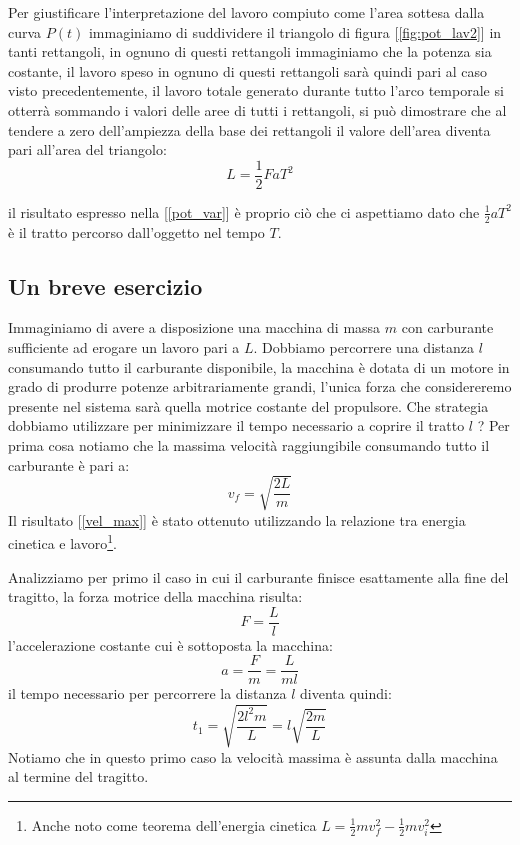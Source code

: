 \documentclass[a4paper,10pt,oneside]{article}
\begin{document}
Per giustificare l'interpretazione del lavoro compiuto come l'area sottesa dalla curva $P(t)$ immaginiamo di suddividere il triangolo di figura [\ref{fig:pot_lav2}] in tanti rettangoli, in ognuno di questi rettangoli immaginiamo che la potenza sia costante, il lavoro speso in ognuno di questi rettangoli sarà quindi pari al caso visto precedentemente, il lavoro totale generato durante tutto l'arco temporale si otterrà sommando i valori delle aree di tutti i rettangoli, si può dimostrare che al tendere a zero dell'ampiezza della base dei rettangoli il valore dell'area diventa pari all'area del triangolo:
\begin{equation}\label{pot_var}
 L=\frac 1 2 FaT^2
\end{equation}

il risultato espresso nella [\ref{pot_var}] è proprio ciò che ci aspettiamo dato che $\frac 1 2 aT^2$ è il tratto percorso dall'oggetto nel tempo $T$.

\subsection*{Un breve esercizio}

Immaginiamo di avere a disposizione una macchina di massa $m$ con carburante sufficiente ad erogare un lavoro pari a $L$. Dobbiamo percorrere una distanza $l$ consumando tutto il carburante disponibile, la macchina è dotata di un motore in grado di produrre potenze arbitrariamente grandi, l'unica forza che considereremo presente nel sistema sarà quella motrice costante del propulsore. Che strategia dobbiamo utilizzare per minimizzare il tempo necessario a coprire il tratto $l$
?
Per prima cosa notiamo che la massima velocità raggiungibile consumando tutto il carburante è pari a:
\begin{equation}\label{vel_max}
 v_f=\sqrt{\frac{2L}{m}}
\end{equation}
Il risultato [\ref{vel_max}] è stato ottenuto utilizzando la relazione tra energia cinetica e lavoro\footnote{Anche noto come teorema dell'energia cinetica $L=\frac 1 2 mv_f^2-\frac 1 2 mv_i^2$}.

Analizziamo per primo il caso  in cui il carburante finisce esattamente alla fine del tragitto, la forza motrice della macchina risulta:
\begin{equation}
 F=\frac{L}{l}
\end{equation}
l'accelerazione costante cui è sottoposta la macchina:
\begin{equation}
 a=\frac F m =\frac{L}{ml}
\end{equation}
il tempo necessario per percorrere la distanza $l$ diventa quindi:
\begin{equation}
 t_1=\sqrt{\frac{2l^2m}{L}}=l\sqrt{\frac{2m}{L}}
\end{equation}
Notiamo che in questo primo caso la velocità massima è assunta dalla macchina al termine del tragitto.
\end{document}
